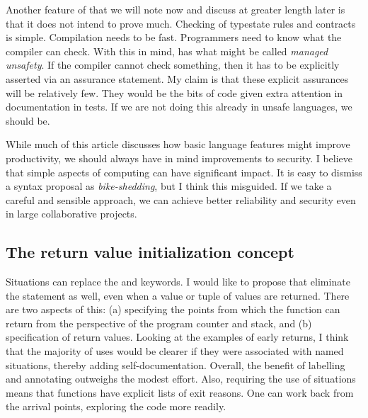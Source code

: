 \documentclass[10pt]{amsart}
\begin{document}
Another feature of \Utop that we will note now and discuss at greater
length later is that it does not intend to prove much.  Checking of
typestate rules and contracts is simple.  Compilation needs to be
fast.  Programmers need to know what the compiler can check.  With
this in mind, \Utop has what might be called \emph{managed unsafety}.
If the compiler cannot check something, then it has to be explicitly
asserted via an assurance statement.  My claim is that these explicit
assurances will be relatively few.  They would be the bits of code
given extra attention in documentation in tests.  If we are not doing
this already in unsafe languages, we should be.

While much of this article discusses how basic language features might
improve productivity, we should always have in mind improvements to
security.  I believe that simple aspects of computing can have
significant impact.  It is easy to dismiss a syntax proposal as
\emph{bike-shedding}, but I think this misguided.  If we take a
careful and sensible approach, we can achieve better reliability and
security even in large collaborative projects.


\subsection{The return value initialization concept}

Situations can replace the \texttt{} and
\texttt{} keywords.  I would like to propose that \Utop
eliminate the \texttt{} statement as well, even when a
value or tuple of values are returned.  There are two aspects of this:
(a) specifying the points from which the function can return from the
perspective of the program counter and stack, and (b) specification of
return values.  Looking at the examples of early returns, I think that
the majority of uses would be clearer if they were associated with
named situations, thereby adding self-documentation.  Overall, the
benefit of labelling and annotating outweighs the modest effort.
Also, requiring the use of situations means that functions have
explicit lists of exit reasons.  One can work back from the arrival
points, exploring the code more readily.
\end{document}
